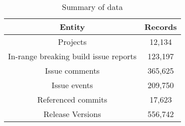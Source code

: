 \begin{table}[h]
    \begin{center}
    \begin{tabular}{ c|c } 
        \textbf{Entity} & \textbf{Records} \\
        \hline
        Projects & 12,134 \\
        \hline
        In-range breaking build issue reports & 123,197 \\
        \hline
        Issue comments & 365,625 \\ 
        \hline
        Issue events & 209,750 \\ 
        \hline
        Referenced commits& 17,623 \\ 
        \hline
        Release Versions & 556,742 \\ 
        \hline
    \end{tabular}
    \end{center}
    \caption{
        \label{tab:all_data} Summary of data
    }
\end{table}